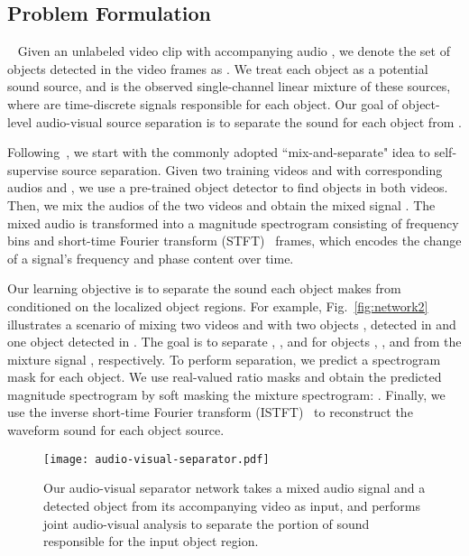\documentclass[10pt,twocolumn,letterpaper]{article}
\begin{document}
\subsection{Problem Formulation}~\label{sec:formulation}
Given an unlabeled video clip  with accompanying audio , we denote the set of  objects detected in the video frames as . We treat each object as a potential sound source, and  is the observed single-channel linear mixture of these sources, where  are time-discrete signals responsible for each object. Our goal of object-level audio-visual source separation is to separate the sound  for each object  from .

Following~\cite{huang2015joint,hershey2016deep,yu2017permutation,zhao2018sound,owens2018audio,gao2019visualsound,ephrat2018looking}, we start with the commonly adopted ``mix-and-separate" idea to self-supervise source separation. Given two training videos  and  with corresponding audios  and , we use a pre-trained object detector to find objects in both videos. Then, we mix the audios of the two videos and obtain the mixed signal . The mixed audio  is transformed into a magnitude spectrogram  consisting of  frequency bins and  short-time Fourier transform (STFT)~\cite{griffin1984signal} frames, which encodes the change of a signal's frequency and phase content over time.

Our learning objective is to separate the sound each object makes from  conditioned on the localized object regions. For example, Fig.~\ref{fig:network2} illustrates a scenario of mixing two videos  and  with two objects ,  detected in  and one object  detected in . The goal is to separate , , and  for objects , , and  from the mixture signal , respectively. To perform separation, we predict a spectrogram mask  for each object. We use real-valued ratio masks and obtain the predicted magnitude spectrogram by soft masking the mixture spectrogram: . Finally, we use the inverse short-time Fourier transform (ISTFT)~\cite{griffin1984signal} to reconstruct the waveform sound for each object source.


\begin{figure}
    \center
    \texttt{[image: audio-visual-separator.pdf]}
    \caption{Our audio-visual separator network takes a mixed audio signal and a detected object from its accompanying video as input, and performs joint audio-visual analysis to separate the portion of sound responsible for the input object region.}
    \label{fig:network1}
    \vspace*{-0.1in}
\end{figure}
\end{document}
